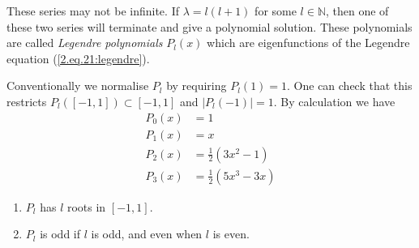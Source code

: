 \documentclass[a4paper]{article}
\begin{document}
These series may not be infinite.
If $\lambda=l(l+1)$ for some $l\in\mathbb N$, then one of these two series will terminate and give a polynomial solution.
These polynomials are called \textit{Legendre polynomials} $P_l(x)$ which are eigenfunctions of the Legendre equation (\ref{2.eq.21:legendre}).

Conventionally we normalise $P_l$ by requiring $P_l(1)=1$.
One can check that this restricts $P_l([-1,1])\subset [-1,1]$ and $|P_l(-1)|=1$.
By calculation we have
\begin{align*}
    P_{0}(x)&=1\\ 
    P_{1}(x)&=x\\ 
    P_{2}(x)&=\frac{1}{2}\left(3 x^{2}-1\right)\\ 
    P_{3}(x)&=\frac{1}{2}\left(5 x^{3}-3 x\right)
\end{align*}
\begin{note}
    \begin{enumerate}
        \item $P_l$ has $l$ roots in $[-1,1]$.
        \item $P_l$ is odd if $l$ is odd, and even when $l$ is even.
    \end{enumerate}
\end{note}
\end{document}
